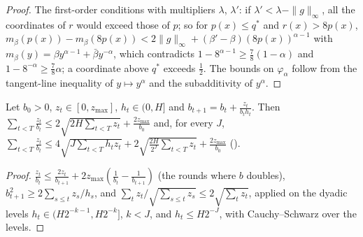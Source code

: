 \begin{proof}
  \leanok
  The first-order conditions with multipliers $\lambda$, $\lambda'$: if $\lambda' < \lambda -
  \|g\|_\infty$, all the coordinates of $r$ would exceed those of $p$; so for $p(x) \le q^*$ and
  $r(x) > 8p(x)$, $m_\beta(p(x)) - m_\beta(8p(x)) < 2\|g\|_\infty + (\beta' - \beta)(8p(x))^{\alpha -
  1}$ with $m_\beta(y) = \beta y^{\alpha - 1} + \bar\beta y^{-\alpha}$, which contradicts
  $1 - 8^{\alpha - 1} \ge \frac78(1 - \alpha)$ and $1 - 8^{-\alpha} \ge \frac78\alpha$; a coordinate
  above $q^*$ exceeds $\frac12$. The bounds on $\varphi_\alpha$ follow from the tangent-line
  inequality of $y \mapsto y^\alpha$ and the subadditivity of $y^\alpha$.
\end{proof}

\begin{lemma}
  \label{lem:spm_rate}
  \leanok
  Let $b_0 > 0$, $z_t \in [0, z_{\max}]$, $h_t \in (0, H]$ and $b_{t+1} = b_t + \frac{z_t}{b_t h_t}$.
  Then $\sum_{t < T}\frac{z_t}{b_t} \le 2\sqrt{2H\sum_{t < T} z_t} + \frac{2z_{\max}}{b_0}$ and,
  for every $J$, $\sum_{t < T}\frac{z_t}{b_t} \le 4\sqrt{J\sum_{t < T} h_t z_t} +
  2\sqrt{\frac{2H}{2^J}\sum_{t < T} z_t} + \frac{2 z_{\max}}{b_0}$ (\cite[Lemmas 9 and
  10]{ito2024adaptive}).
\end{lemma}

\begin{proof}
  \leanok
  $\frac{z_t}{b_t} \le \frac{2z_t}{b_{t+1}} + 2z_{\max}(\frac1{b_t} - \frac1{b_{t+1}})$ (the rounds
  where $b$ doubles), $b_{t+1}^2 \ge 2\sum_{s \le t} z_s/h_s$, and
  $\sum_t z_t/\sqrt{\sum_{s \le t} z_s} \le 2\sqrt{\sum_t z_t}$, applied on the dyadic levels
  $h_t \in (H 2^{-k-1}, H 2^{-k}]$, $k < J$, and $h_t \le H 2^{-J}$, with Cauchy--Schwarz over the
  levels.
\end{proof}

